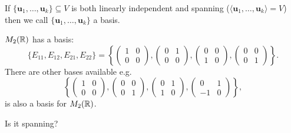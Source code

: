 \documentclass[10pt, a4paper]{article}
\newcommand{\mbf}[1]{\mathbf{#1}}
\begin{document}
\begin{definition}[Basis]
    If $\{\mbf{u}_1, \dotsc, \mbf{u}_k\} \subseteq V$ is both linearly independent and spanning
    ($\langle\mbf{u}_1, \dotsc, \mbf{u}_k\rangle = V$)
    then we call $\{\mbf{u}_1, \dotsc, \mbf{u}_k\}$ a basis.
\end{definition}

$M_2(\mathbb{R})$ has a basis:
\[
\{E_{11}, E_{12}, E_{21}, E_{22}\} = \left\{\begin{pmatrix}
    1 & 0 \\ 0 & 0
\end{pmatrix}, \begin{pmatrix}
    0 & 1 \\ 0 & 0
\end{pmatrix},
\begin{pmatrix}
    0 & 0 \\ 1 & 0
\end{pmatrix}, \begin{pmatrix}
    0 & 0 \\ 0 & 1
\end{pmatrix}\right\}.
\]
There are other bases available e.g.
\[
\left\{\begin{pmatrix}
    1 & 0 \\ 0 & 0
\end{pmatrix}, \begin{pmatrix}
    0 & 0 \\ 0 & 1
\end{pmatrix},
\begin{pmatrix}
    0 & 1 \\ 1 & 0
\end{pmatrix}, \begin{pmatrix}
    0 & 1 \\ -1 & 0
\end{pmatrix}\right\},
\]
is also a basis for $M_2(\mathbb{R})$.

Is it spanning?
\end{document}
